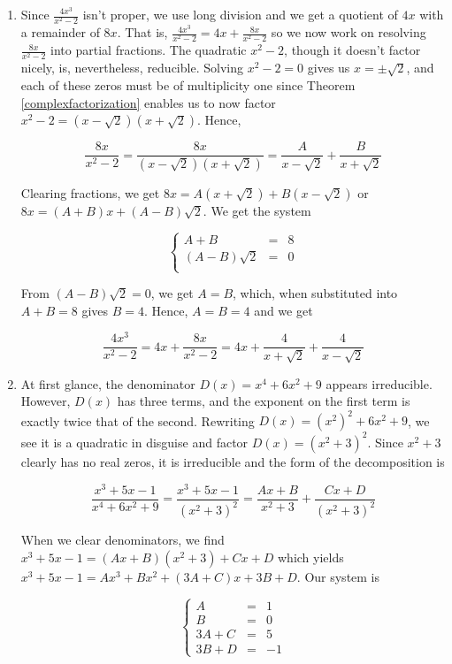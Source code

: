 \begin{ex}
\begin{enumerate}
\item  Since $\frac{4x^3}{x^2-2}$ isn't proper, we use long division and we get a quotient of $4x$ with a remainder of $8x$.  That is, $\frac{4x^3}{x^2-2} = 4x + \frac{8x}{x^2-2}$ so we now work on resolving $\frac{8x}{x^2-2}$ into partial fractions.  The quadratic $x^2-2$, though it doesn't factor nicely, is, nevertheless, reducible. Solving $x^2-2 =0$ gives us $x = \pm \sqrt{2}$, and each of these zeros must be of multiplicity one since Theorem \ref{complexfactorization} enables us to now factor $x^2-2 = \left(x - \sqrt{2}\right)\left(x + \sqrt{2}\right)$. Hence,

\[ \dfrac{8x}{x^2-2} = \dfrac{8x}{ \left(x - \sqrt{2}\right)\left(x + \sqrt{2}\right)} = \dfrac{A}{x - \sqrt{2}} + \dfrac{B}{x + \sqrt{2}} \]

Clearing fractions, we get $8x = A\left(x + \sqrt{2}\right) + B\left(x - \sqrt{2}\right)$ or $8x = (A+B)x + (A-B)\sqrt{2}$.  We get the system


\[ \left\{ \begin{array}{rcr}  A+B & = & 8 \\ (A-B)\sqrt{2} & = & 0 \\ \end{array} \right.\]

From $(A-B)\sqrt{2}=0$, we get $A=B$, which, when substituted into $A+B = 8$ gives $B = 4$.  Hence, $A = B = 4$ and we get

\[\dfrac{4x^3}{x^2-2} = 4x + \dfrac{8x}{x^2-2} = 4x + \dfrac{4}{x + \sqrt{2}} + \dfrac{4}{x - \sqrt{2}}\]

\item  At first glance, the denominator $D(x) = x^4+6x^2+9$ appears irreducible. However, $D(x)$ has three terms, and the exponent on the first term is exactly twice that of the second.  Rewriting $D(x) = \left(x^2\right)^2 + 6x^2 + 9$, we see it is a quadratic in disguise and factor $D(x) = \left(x^2+3\right)^2$.  Since $x^2+3$ clearly has no real zeros, it is irreducible and the form of the decomposition is

\[ \dfrac{x^3+5x-1}{x^4+6x^2+9} =  \dfrac{x^3+5x-1}{\left(x^2+3\right)^2} = \dfrac{Ax+B}{x^2+3} + \dfrac{Cx+D}{\left(x^2+3\right)^2}\]

When we clear denominators, we find $x^3 + 5x-1 = (Ax+B)\left(x^2+3\right) + Cx + D$ which yields $x^3+5x-1 = Ax^3 + Bx^2 + (3A+C)x + 3B+D$.  Our system is 

\[ \left\{ \begin{array}{rcr} A & = & 1 \\ B & = & 0 \\ 3A + C & = & 5 \\ 3B+D & = & -1 \end{array} \right.\]


\end{enumerate}
\end{ex}
